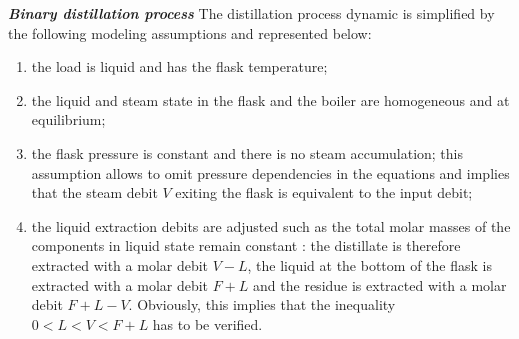 \begin{exemple}{\bf \em Binary distillation process}
The distillation process dynamic is simplified by the following modeling assumptions and represented below:
\begin{enumerate}
\item the load is liquid and has the flask temperature;
\item the liquid and steam state in the flask and the boiler are homogeneous and at equilibrium;
\item the flask pressure is constant and there is no steam accumulation; this assumption allows to omit pressure dependencies
in the equations and implies that the steam debit $V$  exiting the flask is equivalent to the input debit; 
\item the liquid extraction debits are adjusted such as the total molar masses of the components in liquid state remain constant : 
the distillate is therefore extracted with a molar debit $V-L$, the liquid at the bottom of the flask is extracted with a molar debit $F+L$
and the residue is extracted with a molar debit $F+L-V$. Obviously, this implies that the inequality $0 < L < V < F+L$ has to be verified.\\
\end{enumerate}


\end{exemple}
